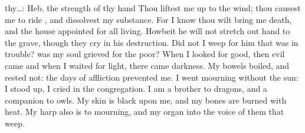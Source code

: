 {{thy…: Heb. the strength of thy hand}
Thou liftest me
up to the
wind; thou causest me to
ride
{}, and
dissolvest my
substance.
For I
know
{} thou wilt
bring me
{}
death, and
{} the
house
appointed for all
living.
Howbeit he will not stretch
out
{}
hand to the
grave, though they
cry in his
destruction.
Did not I
weep for him that was in
trouble? was
{} my
soul
grieved for the
poor?
When I
looked for
good, then
evil
came
{} and when I
waited for
light, there
came
darkness.
My
bowels
boiled, and
rested not: the
days of
affliction
prevented me.
I
went
mourning without the
sun: I stood
up,
{} I
cried in the
congregation.
I am a
brother to
dragons, and a
companion to
owls.
My
skin is
black upon me, and my
bones are
burned with
heat.
My
harp also is
{} to
mourning, and my
organ into the
voice of them that
weep.

}
